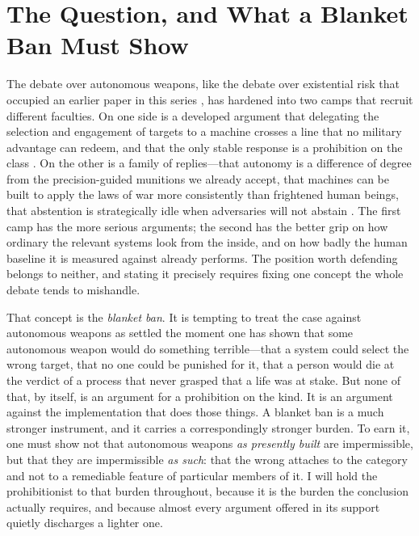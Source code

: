 \documentclass[11pt]{article}
\begin{document}
\section{The Question, and What a Blanket Ban Must Show}
\label{sec:question}

The debate over autonomous weapons, like the debate over existential risk that occupied an earlier paper in this series \citep{penumbra2026}, has hardened into two camps that recruit different faculties. On one side is a developed argument that delegating the selection and engagement of targets to a machine crosses a line that no military advantage can redeem, and that the only stable response is a prohibition on the class \citep{sparrow2007, asaro2012, sharkey2012, hrw2012}. On the other is a family of replies---that autonomy is a difference of degree from the precision-guided munitions we already accept, that machines can be built to apply the laws of war more consistently than frightened human beings, that abstention is strategically idle when adversaries will not abstain \citep{arkin2009, scharre2018}. The first camp has the more serious arguments; the second has the better grip on how ordinary the relevant systems look from the inside, and on how badly the human baseline it is measured against already performs. The position worth defending belongs to neither, and stating it precisely requires fixing one concept the whole debate tends to mishandle.

That concept is the \emph{blanket ban}. It is tempting to treat the case against autonomous weapons as settled the moment one has shown that some autonomous weapon would do something terrible---that a system could select the wrong target, that no one could be punished for it, that a person would die at the verdict of a process that never grasped that a life was at stake. But none of that, by itself, is an argument for a prohibition on the kind. It is an argument against the implementation that does those things. A blanket ban is a much stronger instrument, and it carries a correspondingly stronger burden. To earn it, one must show not that autonomous weapons \emph{as presently built} are impermissible, but that they are impermissible \emph{as such}: that the wrong attaches to the category and not to a remediable feature of particular members of it. I will hold the prohibitionist to that burden throughout, because it is the burden the conclusion actually requires, and because almost every argument offered in its support quietly discharges a lighter one.
\end{document}
